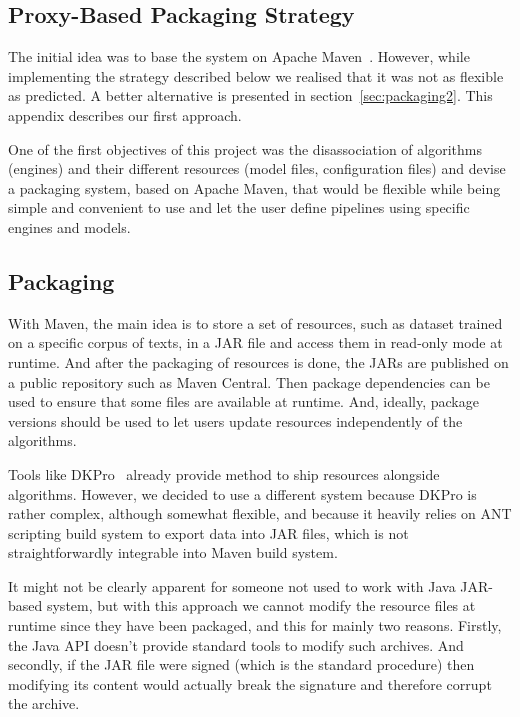 \documentclass{article}
\newcommand{\JAR}{JAR\xspace}
\begin{document}
\clearpage
\begin{appendices}

\section{Proxy-Based Packaging Strategy}
\label{sec:packaging1}

The initial idea was to base the system on Apache Maven~\cite{maven}. However, while implementing the
strategy described below we realised that it was not as flexible as predicted. A better alternative
is presented in section~\ref{sec:packaging2}. This appendix describes our first approach.

One of the first objectives of this project was the disassociation of algorithms (engines) and their
different resources (model files, configuration files) and devise a packaging system, based on
Apache Maven, that would be flexible while being simple and convenient to use and let the user
define pipelines using specific engines and models.

\subsection{Packaging}

With Maven, the main idea is to store a set of resources, such as dataset trained on a specific
corpus of texts, in a \JAR file and access them in read-only mode at runtime. And after the
packaging of resources is done, the {\JAR}s are published on a public repository such as Maven
Central. Then package dependencies can be used to ensure that some files are available at runtime.
And, ideally, package versions should be used to let users update resources independently of the
algorithms.

Tools like DKPro~\cite{dkpro} already provide method to ship resources alongside algorithms.
However, we decided to use a different system because DKPro is rather complex, although somewhat
flexible, and because it heavily relies on ANT scripting build system to export data into \JAR
files, which is not straightforwardly integrable into Maven build system.

It might not be clearly apparent for someone not used to work with Java \JAR-based system, but with
this approach we cannot modify the resource files at runtime since they have been packaged, and this
for mainly two reasons. Firstly, the Java API doesn't provide standard tools to modify such
archives. And secondly, if the \JAR file were signed (which is the standard procedure) then
modifying its content would actually break the signature and therefore corrupt the archive.


\end{appendices}
\end{document}
